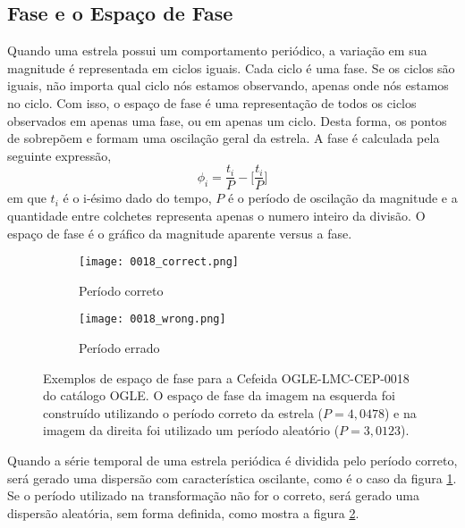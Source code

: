 \subsection{Fase e o Espaço de Fase}

Quando uma estrela possui um comportamento periódico, a variação em sua magnitude é representada em ciclos iguais. Cada ciclo é uma fase. Se os ciclos são iguais, não importa qual ciclo nós estamos observando, apenas onde nós estamos no ciclo. Com isso, o espaço de fase é uma representação de todos os ciclos observados em apenas uma fase, ou em apenas um ciclo. Desta forma, os pontos de sobrepõem e formam uma oscilação geral da estrela. A fase é calculada pela seguinte expressão,
\begin{equation}
\phi_i = \frac{t_i}{P} - \Big[\frac{t_i}{P}\Big]
\end{equation}
em que $t_i$ é o i-ésimo dado do tempo, $P$ é o período de oscilação da magnitude e a quantidade entre colchetes representa apenas o numero inteiro da divisão. O espaço de fase é o gráfico da magnitude aparente versus a fase.


\begin{figure}[h!]
\centering
\begin{subfigure}{.5\textwidth}
  \centering
  \texttt{[image: 0018\_correct.png]}
  \caption{Período correto}
  \label{fig:right}
\end{subfigure}%
\begin{subfigure}{.5\textwidth}
  \centering
  \texttt{[image: 0018\_wrong.png]}
  \caption{Período errado}
  \label{fig:wrong}
\end{subfigure}
\caption[Exemplos de espaço de fase]{Exemplos de espaço de fase para a Cefeida OGLE-LMC-CEP-0018 do catálogo OGLE. O espaço de fase da imagem na esquerda foi construído utilizando o período correto da estrela ($P=4,0478$) e na imagem da direita foi utilizado um período aleatório ($P=3,0123$).}
\label{fig:exemplo_fase}
\end{figure}

Quando a série temporal de uma estrela periódica é dividida pelo período correto, será gerado uma dispersão com característica oscilante, como é o caso da figura \ref{fig:right}. Se o período utilizado na transformação não for o correto, será gerado uma dispersão aleatória, sem forma definida, como mostra a figura \ref{fig:wrong}. 


